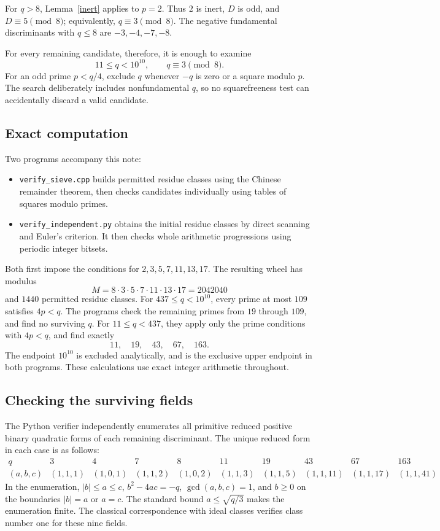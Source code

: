 \documentclass[11pt]{article}
\newcommand{\norm}[1]{\lvert #1\rvert}
\begin{document}
For \(q>8\), Lemma~\ref{inert} applies to \(p=2\).
Thus \(2\) is inert, \(D\) is odd, and \(D\equiv5\pmod8\);
equivalently, \(q\equiv3\pmod8\).
The negative fundamental discriminants with \(q\le8\) are
\(-3,-4,-7,-8\).

For every remaining candidate, therefore, it is enough to examine
\[
 11\le q<10^{10},\qquad q\equiv3\pmod8.
\]
For an odd prime \(p<q/4\), exclude \(q\) whenever \(-q\) is zero
or a square modulo \(p\).
The search deliberately includes nonfundamental \(q\), so no
squarefreeness test can accidentally discard a valid candidate.

\subsection*{Exact computation}
Two programs accompany this note:
\begin{itemize}
\item \texttt{verify\_sieve.cpp} builds permitted residue classes using
the Chinese remainder theorem, then checks candidates individually
using tables of squares modulo primes.
\item \texttt{verify\_independent.py} obtains the initial residue
classes by direct scanning and Euler's criterion. It then checks
whole arithmetic progressions using periodic integer bitsets.
\end{itemize}

Both first impose the conditions for \(2,3,5,7,11,13,17\).
The resulting wheel has modulus
\[
 M=8\cdot3\cdot5\cdot7\cdot11\cdot13\cdot17
   =2042040
\]
and \(1440\) permitted residue classes.
For \(437\le q<10^{10}\), every prime at most \(109\) satisfies
\(4p<q\). The programs check the remaining primes from \(19\)
through \(109\), and find no surviving \(q\).
For \(11\le q<437\), they apply only the prime conditions
with \(4p<q\), and find exactly
\[
 11,\quad19,\quad43,\quad67,\quad163.
\]
The endpoint \(10^{10}\) is excluded analytically, and is the
exclusive upper endpoint in both programs.
These calculations use exact integer arithmetic throughout.

\subsection*{Checking the surviving fields}
The Python verifier independently enumerates all primitive reduced
positive binary quadratic forms of each remaining discriminant.
The unique reduced form in each case is as follows:
\[
\begin{array}{c|rrrrrrrrr}
q&3&4&7&8&11&19&43&67&163\\ \hline
(a,b,c)&
(1,1,1)&(1,0,1)&(1,1,2)&(1,0,2)&
(1,1,3)&(1,1,5)&(1,1,11)&(1,1,17)&(1,1,41)
\end{array}
\]
In the enumeration, \(\norm b\le a\le c\),
\(b^2-4ac=-q\), \(\gcd(a,b,c)=1\), and \(b\ge0\) on
the boundaries \(\norm b=a\) or \(a=c\).
The standard bound \(a\le\sqrt{q/3}\) makes the enumeration finite.
The classical correspondence with ideal classes verifies
class number one for these nine fields.
\end{document}
